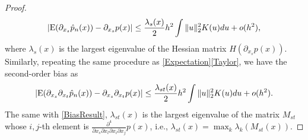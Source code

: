 \documentclass[aos,preprint]{imsart}
\theoremstyle{remark}
\begin{document}
\begin{appendix}
\begin{proof}
\begin{equation}\label{BiasResult}
|{\rm E}(\partial_{x_s} \hat{p}_n(x)) - \partial_{x_s}p(x)|  \leq \frac{\lambda_s(x)}{2} h^2 \int \|u\|_2^2 K(u) du+o(h^2),
\end{equation}
where $\lambda_s(x)$ is the largest eigenvalue of the Hessian matrix $H(\partial_{x_s}p(x))$. Similarly, repeating the same procedure as \eqref{Expectation}\eqref{Taylor}, we have the second-order bias as
\begin{equation}\label{order2}
|{\rm E}( \partial_{x_s} \partial_{x_t}   \hat{p}_n(x)) -  \partial_{x_s} \partial_{x_t} p(x)| \leq \frac{\lambda_{st}(x)}{2} h^2 \int \|u\|_2^2 K(u) du+o(h^2).
\end{equation}
The same with \eqref{BiasResult}, $\lambda_{st}(x)$ is the largest eigenvalue of the matrix $M_{st}$ whose $i,j$-th element is $\frac{\partial^4}{\partial x_s\partial x_t \partial x_i \partial x_j} p(x)$, i.e., $\lambda_{st}(x)= \max_k \lambda_k( M_{st}(x))$.
\end{proof}

\end{appendix}
\end{document}
